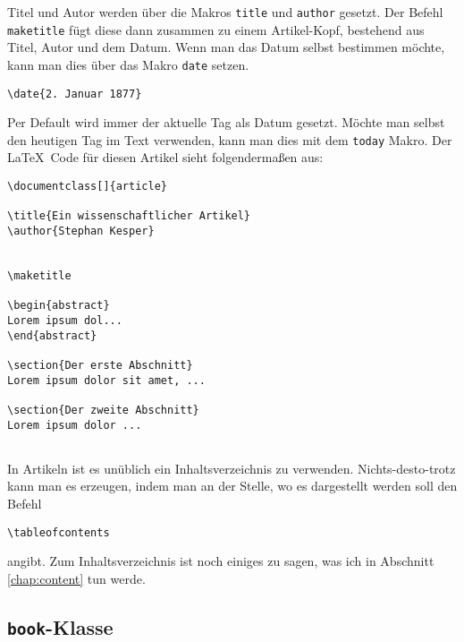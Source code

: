 Titel und Autor werden über die Makros \texttt{title} und \texttt{author} gesetzt. Der Befehl \texttt{maketitle} fügt diese dann zusammen zu einem Artikel-Kopf, bestehend aus Titel, Autor und dem Datum. Wenn man das Datum selbst bestimmen möchte, kann man dies über das Makro \texttt{date} setzen. 
\begin{verbatim}
\date{2. Januar 1877}
\end{verbatim}
Per Default wird immer der aktuelle Tag als Datum gesetzt. Möchte man selbst den heutigen Tag im Text verwenden, kann man dies mit dem \texttt{today} Makro. Der \LaTeX\ Code für diesen Artikel sieht folgendermaßen aus:
\footnotesize
\begin{verbatim}
\documentclass[]{article}

\title{Ein wissenschaftlicher Artikel}
\author{Stephan Kesper}


\maketitle

\begin{abstract}
Lorem ipsum dol...
\end{abstract}

\section{Der erste Abschnitt}
Lorem ipsum dolor sit amet, ...

\section{Der zweite Abschnitt}
Lorem ipsum dolor ...


\end{verbatim}
\normalsize

In Artikeln ist es unüblich ein Inhaltsverzeichnis zu verwenden. Nichts-des\-to-trotz kann man es erzeugen, indem man an der Stelle, wo es dargestellt werden soll den Befehl
\begin{verbatim}
\tableofcontents
\end{verbatim}
angibt. Zum Inhaltsverzeichnis ist noch einiges zu sagen, was ich in Abschnitt \ref{chap:content} tun werde.


\subsection{\texttt{book}-Klasse}

